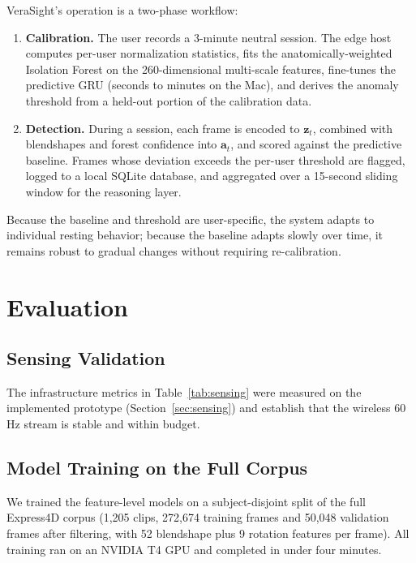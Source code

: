 \documentclass[sigconf]{acmart}
\begin{document}
VeraSight's operation is a two-phase workflow:
\begin{enumerate}
    \item \textbf{Calibration.} The user records a 3-minute neutral session.
          The edge host computes per-user normalization statistics, fits the
          anatomically-weighted Isolation Forest on the 260-dimensional
          multi-scale features, fine-tunes the predictive GRU (seconds to
          minutes on the Mac), and derives the anomaly threshold from a
          held-out portion of the calibration data.
    \item \textbf{Detection.} During a session, each frame is encoded to
          $\mathbf{z}_t$, combined with blendshapes and forest confidence into
          $\mathbf{a}_t$, and scored against the predictive baseline. Frames
          whose deviation exceeds the per-user threshold are flagged, logged to
          a local SQLite database, and aggregated over a 15-second sliding
          window for the reasoning layer.
\end{enumerate}
Because the baseline and threshold are user-specific, the system adapts to
individual resting behavior; because the baseline adapts slowly over time, it
remains robust to gradual changes without requiring re-calibration.

\section{Evaluation}

\subsection{Sensing Validation}
The infrastructure metrics in Table~\ref{tab:sensing} were measured on the
implemented prototype (Section~\ref{sec:sensing}) and establish that the
wireless 60 Hz stream is stable and within budget.

\subsection{Model Training on the Full Corpus}
We trained the feature-level models on a subject-disjoint split of the full
Express4D corpus (1,205 clips, 272,674 training frames and 50,048 validation
frames after filtering, with 52 blendshape plus 9 rotation features per frame).
All training ran on an NVIDIA T4 GPU and completed in under four minutes.
\end{document}
